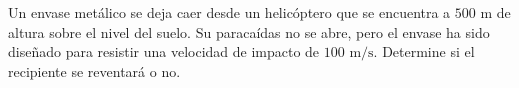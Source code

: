 \item Un envase metálico se deja caer desde un helicóptero que se encuentra a $500 \text{ m}$ de altura sobre el nivel del suelo. Su paracaídas no se abre, pero el envase ha sido diseñado para resistir una velocidad de impacto de $100 \text{ m/s}$. Determine si el recipiente se reventará o no.
